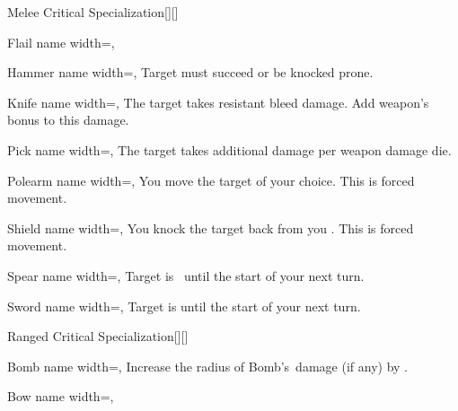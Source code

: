 \begin{PageFrontLandscape}
\begin{TablesHalf}{\frontTableHeight}
\begin{Table}{Melee Critical Specialization}[][]
\begin{entry}{Flail}{%
                name width=\conditionLength,%
            }
            \end{entry}
            \begin{entry}{Hammer}{%
                name width=\conditionLength,%
            }
                Target must succeed \Fortitude[][before=Class] or be knocked prone.
            \end{entry}
            \begin{entry}{Knife}{%
                name width=\conditionLength,%
            }
                The target takes  resistant bleed damage. Add weapon's \Item bonus to this damage.
            \end{entry}
            \begin{entry}{Pick}{%
                name width=\conditionLength,%
            }
                The target takes  additional damage per weapon damage die.
            \end{entry}
            \begin{entry}{Polearm}{%
                name width=\conditionLength,%
            }
                You move the target  \Feet of your choice. This is forced movement.
            \end{entry}
            \begin{entry}{Shield}{%
                name width=\conditionLength,%
            }
                You knock the target back from you  \Feet. This is forced movement.
            \end{entry}
            \begin{entry}{Spear}{%
                name width=\conditionLength,%
            }
                Target is \Clumsy\, until the start of your next turn.
            \end{entry}
            \begin{entry}{Sword}{%
                name width=\conditionLength,%
            }
                Target is \OffGuard until the start of your next turn.
            \end{entry}
        \end{Table}
        \TableSpace
        \begin{Table}{Ranged Critical Specialization}[][]
            \begin{entry}{Bomb}{%
                name width=\conditionLength,%
            }
                Increase the radius of Bomb's \Splash\,damage {(if any)} by  \Feet.
            \end{entry}
            \begin{entry}{Bow}{%
                name width=\conditionLength,%
            }

\end{entry}
\end{Table}
\end{TablesHalf}
\end{PageFrontLandscape}
